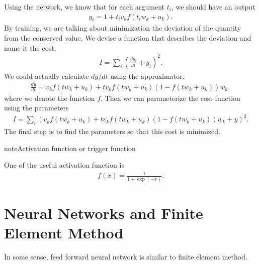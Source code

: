 \documentclass[letterpaper,10pt,english]{sphinxmanual}
\begin{document}
Using the network, we know that for each argument \(t_i\), we should have an output
\begin{equation*}
\begin{split}y_i= 1+t_i v_k f(t_i w_k+u_k).\end{split}
\end{equation*}
By training, we are talking about minimization the deviation of the quantity from the conserved value. We devise a function that describes the deviation and name it the cost,
\begin{equation*}
\begin{split}I=\sum_i\left( \frac{dy_i}{dt}+y_i \right)^2.\end{split}
\end{equation*}
We could actually calculate \(dy/dt\) using the approximator,
\begin{equation*}
\begin{split}\frac{dy}{dt} = v_k f(t w_k+u_k) + t v_k f(tw_k+u_k) (1-f(tw_k+u_k))w_k,\end{split}
\end{equation*}
where we denote the  function \(f\). Then we can parameterize the cost function using the parameters
\begin{equation*}
\begin{split}I = \sum_i \left(  v_k f(t w_k+u_k) + t v_k f(tw_k+u_k) (1-f(tw_k+u_k)) w_k + y \right)^2.\end{split}
\end{equation*}
The final step is to find the parameters so that this cost is minimized.

\begin{sphinxadmonition}{note}{Activation function or trigger function}

One of the useful activation function is
\begin{equation*}
\begin{split}f(x)=\frac{1}{1+\exp(-x)}.\end{split}
\end{equation*}\end{sphinxadmonition}


\section{Neural Networks and Finite Element Method}
\label{\detokenize{machine-intelligence/neural-network-and-fem::doc}}\label{\detokenize{machine-intelligence/neural-network-and-fem:neural-networks-and-finite-element-method}}
In some sense, feed forward neural network is similar to finite element method.
\end{document}
